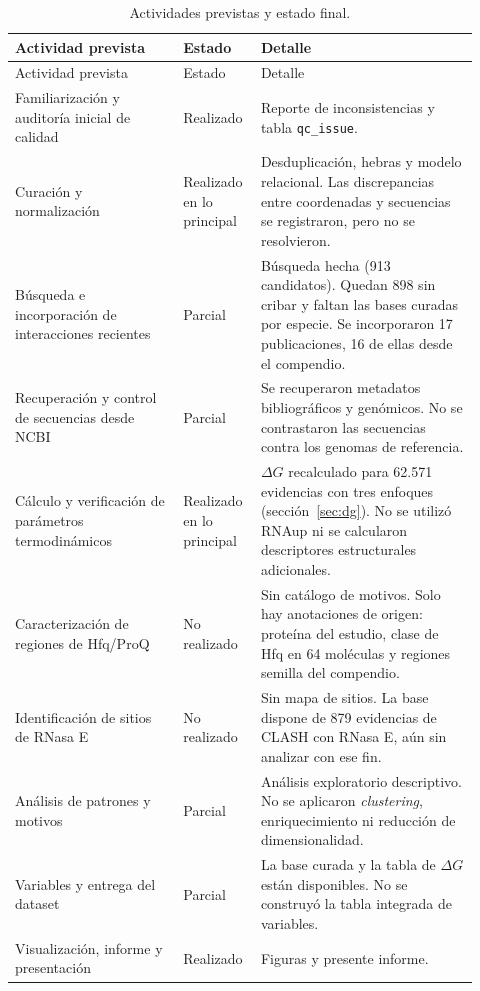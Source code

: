 \documentclass[11pt,a4paper]{article}
\newcommand{\dG}{$\Delta G$}
\begin{document}
{\small
\begin{longtable}{>{\raggedright\arraybackslash}p{0.34\linewidth} >{\raggedright\arraybackslash}p{0.14\linewidth} >{\raggedright\arraybackslash}p{0.44\linewidth}}
\caption{Actividades previstas y estado final.}\label{tab:brechas}\\
\toprule
Actividad prevista & Estado & Detalle\\
\midrule\endfirsthead
\toprule
Actividad prevista & Estado & Detalle\\
\midrule\endhead
Familiarización y auditoría inicial de calidad & Realizado & Reporte de inconsistencias y tabla \texttt{qc\_issue}.\\
Curación y normalización & Realizado en lo principal & Desduplicación, hebras y modelo relacional. Las discrepancias entre coordenadas y secuencias se registraron, pero no se resolvieron.\\
Búsqueda e incorporación de interacciones recientes & Parcial & Búsqueda hecha (913 candidatos). Quedan 898 sin cribar y faltan las bases curadas por especie. Se incorporaron 17 publicaciones, 16 de ellas desde el compendio.\\
Recuperación y control de secuencias desde NCBI & Parcial & Se recuperaron metadatos bibliográficos y genómicos. No se contrastaron las secuencias contra los genomas de referencia.\\
Cálculo y verificación de parámetros termodinámicos & Realizado en lo principal & \dG{} recalculado para 62.571 evidencias con tres enfoques (sección~\ref{sec:dg}). No se utilizó RNAup ni se calcularon descriptores estructurales adicionales.\\
Caracterización de regiones de Hfq/ProQ & No realizado & Sin catálogo de motivos. Solo hay anotaciones de origen: proteína del estudio, clase de Hfq en 64 moléculas y regiones semilla del compendio.\\
Identificación de sitios de RNasa E & No realizado & Sin mapa de sitios. La base dispone de 879 evidencias de CLASH con RNasa E, aún sin analizar con ese fin.\\
Análisis de patrones y motivos & Parcial & Análisis exploratorio descriptivo. No se aplicaron \emph{clustering}, enriquecimiento ni reducción de dimensionalidad.\\
Variables y entrega del dataset & Parcial & La base curada y la tabla de \dG{} están disponibles. No se construyó la tabla integrada de variables.\\
Visualización, informe y presentación & Realizado & Figuras y presente informe.\\
\bottomrule
\end{longtable}
}
\end{document}
